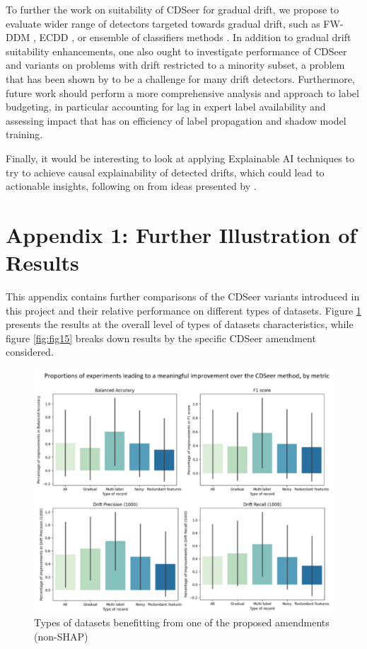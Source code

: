 \documentclass{svproc}
\begin{document}
To further the work on suitability of CDSeer for gradual drift, we propose to evaluate wider range of detectors targeted towards gradual drift, such as FW-DDM \cite{liu2017}, ECDD \cite{ross2012}, or ensemble of classifiers methods \cite{zhu2007}. In addition to gradual drift suitability enhancements, one also ought to investigate performance of CDSeer and variants on problems with drift restricted to a minority subset, a problem that has been shown by \cite{giobergia2024} to be a challenge for many drift detectors. Furthermore, future work should perform a more comprehensive analysis and approach to label budgeting, in particular accounting for lag in expert label availability and assessing impact that has on efficiency of label propagation and shadow model training.

Finally, it would be interesting to look at applying Explainable AI techniques to try to achieve causal explainability of detected drifts, which could lead to actionable insights, following on from ideas presented by \cite{komnick2025}. 


\printbibliography
 
 \section{Appendix 1: Further Illustration of Results}
 \label{sec:secApp1}
 This appendix contains further comparisons of the CDSeer variants introduced in this project and their relative performance on different types of datasets. Figure \ref{fig:fig14} presents the results at the overall level of types of datasets characteristics, while figure \ref{fig:fig15} breaks down results by the specific CDSeer amendment considered.
 
 \begin{figure}
 	\centering
 	\includegraphics[scale=.7]{figures/Fig14_composite.png}
 	\caption{Types of datasets benefitting from one of the proposed amendments (non-SHAP)}
 	\label{fig:fig14}
\end{figure}
 
\end{document}
